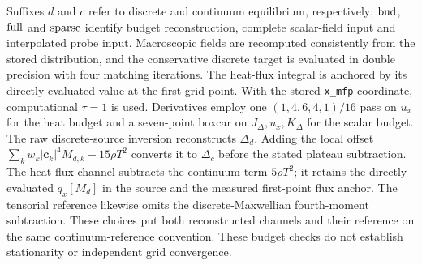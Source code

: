 \documentclass[lineno,paper]{JFM-FLM_Au}
\newenvironment{revision}{\nolinenumbers\begin{tcolorbox}[breakable,colback=revisionyellow,colframe=revisionyellow,boxrule=0pt,arc=0pt,left=5pt,right=5pt,top=5pt,bottom=5pt,before skip=6pt,after skip=6pt]\captionsetup{width=\linewidth}}{\end{tcolorbox}\linenumbers}
\newenvironment{revision}{}{}
\begin{document}
\begin{revision}
Suffixes $d$ and $c$
refer to discrete and continuum equilibrium, respectively;
$\rm bud$, $\rm full$ and $\rm sparse$ identify budget reconstruction,
complete scalar-field input and interpolated probe input.
Macroscopic fields are recomputed consistently from the stored distribution, and the conservative discrete target is evaluated in double precision with four matching iterations. The heat-flux integral is anchored by its directly evaluated value at the first grid point. With the stored \texttt{x\_mfp} coordinate, computational $\tau=1$ is used. Derivatives employ one $(1,4,6,4,1)/16$ pass on $u_x$ for the heat budget and a seven-point boxcar on $J_\Delta,u_x,K_\Delta$ for the scalar budget. The raw discrete-source inversion reconstructs $\Delta_d$. Adding the local offset $\sum_k w_k|\boldsymbol c_k|^4M_{d,k}-15\rho T^2$ converts it to $\Delta_c$ before the stated plateau subtraction. The heat-flux channel subtracts the continuum term $5\rho T^2$; it retains the directly evaluated $q_x[M_d]$ in the source and the measured first-point flux anchor. The tensorial reference likewise omits the discrete-Maxwellian fourth-moment subtraction. These choices put both reconstructed channels and their reference on the same continuum-reference convention. These budget checks do not establish stationarity or independent grid convergence.


\end{revision}
\end{document}
